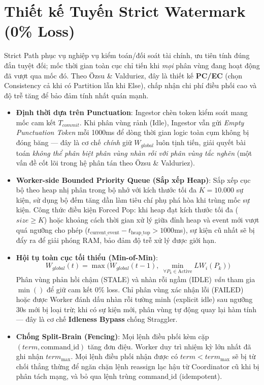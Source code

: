 \documentclass[9pt,a4paper]{article}
\begin{document}
\section{Thiết kế Tuyến Strict Watermark (0\% Loss)}
Strict Path phục vụ nghiệp vụ kiểm toán/đối soát tài chính, ưu tiên tính đúng đắn tuyệt đối; mốc thời gian toàn cục chỉ tiến khi \emph{mọi} phân vùng đang hoạt động đã vượt qua mốc đó. Theo Özsu \& Valduriez, đây là thiết kế \textbf{PC/EC} (chọn Consistency cả khi có Partition lẫn khi Else), chấp nhận chi phí điều phối cao và độ trễ tăng để bảo đảm tính nhất quán mạnh.

\begin{itemize}[leftmargin=*]
    \item \textbf{Định thời dựa trên Punctuation}: Ingestor chèn token kiểm soát mang mốc cam kết $T_{commit}$. Khi phân vùng rảnh (Idle), Ingestor vẫn gửi \emph{Empty Punctuation Token} mỗi 1000ms để dòng thời gian logic toàn cụm không bị đóng băng --- đây là cơ chế \emph{chính} giữ $W_{global}$ luôn tịnh tiến, giải quyết bài toán \emph{không thể phân biệt phân vùng nhàn rỗi với phân vùng tắc nghẽn} (một vấn đề cốt lõi trong hệ phân tán theo Özsu \& Valduriez).
    \item \textbf{Worker-side Bounded Priority Queue (Sắp xếp Heap)}: Sắp xếp cục bộ theo heap nhị phân trong bộ nhớ với kích thước tối đa $K = 10.000$ sự kiện, sử dụng bộ đếm tăng dần làm tiêu chí phụ phá hòa khi trùng mốc sự kiện. Công thức điều kiện Forced Pop: khi heap đạt kích thước tối đa ($size \ge K$) hoặc khoảng cách thời gian xử lý giữa đỉnh heap và event mới vượt quá ngưỡng cho phép ($t_{\text{current\_event}} - t_{\text{heap\_top}} > 1000$ms), sự kiện cũ nhất sẽ bị đẩy ra để giải phóng RAM, bảo đảm độ trễ xử lý được giới hạn.
    \item \textbf{Hội tụ toàn cục tối thiểu (Min-of-Min)}:
    {\large
    \begin{equation}
    \boxed{W_{global}(t) = \max\Big(W_{global}(t{-}1),\ \min_{\forall P_k \in \text{Active}} LW_i(P_k)\Big)}
    \end{equation}
    }
    Phân vùng phản hồi chậm (STALE) và nhàn rỗi ngầm (IDLE) \emph{vẫn} tham gia $\min()$ để giữ cam kết 0\% loss. Chỉ phân vùng xác nhận lỗi (FAILED) hoặc được Worker đánh dấu nhàn rỗi tường minh (explicit idle) sau ngưỡng 30s mới bị loại trừ; khi có sự kiện mới, phân vùng tự động quay lại hàm tính --- đây là cơ chế \textbf{Idleness Bypass} chống Straggler.
    \item \textbf{Chống Split-Brain (Fencing)}: Mọi lệnh điều phối kèm cặp $(term, \text{command\_id})$ tăng đơn điệu. Worker duy trì nhiệm kỳ lớn nhất đã ghi nhận $term_{\text{max}}$. Mọi lệnh điều phối nhận được có $term < term_{\text{max}}$ sẽ bị từ chối thẳng thừng để ngăn chặn lệnh reassign lạc hậu từ Coordinator cũ khi bị phân tách mạng, và bỏ qua lệnh trùng $\text{command\_id}$ (idempotent).

\end{itemize}
\end{document}
